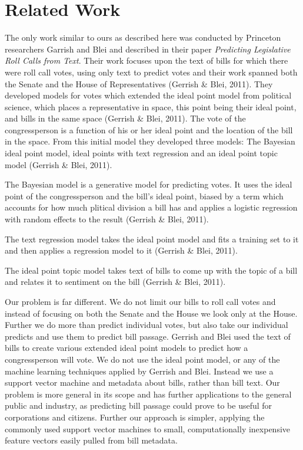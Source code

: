 \documentclass[11pt,letterpaper,twocolumn]{article}
\begin{document}
\section{Related Work}

The only work similar to ours as described here was conducted by Princeton researchers Garrish and Blei and described in their paper \textit{Predicting Legislative Roll Calls from Text}. Their work focuses upon the text of bills for which there were roll call votes, using only text to predict votes and their work spanned both the Senate and the House of Representatives (Gerrish \& Blei, 2011). They developed models for votes which extended the ideal point model from political science, which places a representative in space, this point being their ideal point, and bills in the same space (Gerrish \& Blei, 2011). The vote of the congressperson is a function of his or her ideal point and the location of the bill in the space. From this initial model they developed three models: The Bayesian ideal point model, ideal points with text regression and an ideal point topic model (Gerrish \& Blei, 2011). 

The Bayesian model is a generative model for predicting votes. It uses the ideal point of the congressperson and the bill's ideal point, biased by a term which accounts for how much plitical division a bill has and applies a logistic regression with random effects to the result (Gerrish \& Blei, 2011). 

The text regression model takes the ideal point model and fits a training set to it and then applies a regression model to it (Gerrish \& Blei, 2011).

The ideal point topic model takes text of bills to come up with the topic of a bill and relates it to sentiment on the bill (Gerrish \& Blei, 2011).

Our problem is far different. We do not limit our bills to roll call votes and instead of focusing on both the Senate and the House we look only at the House. Further we do more than predict individual votes, but also take our individual predicts and use them to predict bill passage. Gerrish and Blei used the text of bills to create various extended ideal point models to predict how a congressperson will vote. We do not use the ideal point model, or any of the machine learning techniques applied by Gerrish and Blei. Instead we use a support vector machine and metadata about bills, rather than bill text. Our problem is more general in its scope and has further applications to the general public and industry, as predicting bill passage could prove to be useful for  corporations and citizens. Further our approach is simpler, applying the commonly used support vector machines to small, computationally inexpensive feature vectors easily pulled from bill metadata.
 
\end{document}
